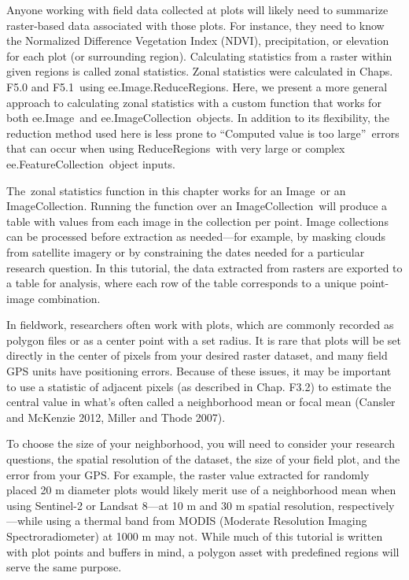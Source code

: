 \documentclass[
  letterpaper,
  DIV=11,
  numbers=noendperiod]{scrreprt}
\begin{document}
Anyone working with field data collected at plots will likely need to
summarize raster-based data associated with those plots. For instance,
they need to know the Normalized Difference Vegetation Index (NDVI),
precipitation, or elevation for each plot (or surrounding region).
Calculating statistics from a raster within given regions is called
zonal statistics. Zonal statistics were calculated in Chaps. F5.0 and
F5.1~using ee.Image.ReduceRegions. Here, we present a more general
approach to calculating zonal statistics with a custom function that
works for both ee.Image~and ee.ImageCollection~objects. In addition to
its flexibility, the reduction method used here is less prone to
``Computed value is too large''~errors that can occur when using
ReduceRegions~with very large or complex ee.FeatureCollection~object
inputs.

The~zonal statistics function in this chapter works for an Image~or an
ImageCollection. Running the function over an ImageCollection~will
produce a table with values from each image in the collection per point.
Image collections can be processed before extraction as needed---for
example, by masking clouds from satellite imagery or by constraining the
dates needed for a particular research question. In this tutorial, the
data extracted from rasters are exported to a table for analysis, where
each row of the table corresponds to a unique point-image combination.

In fieldwork, researchers often work with plots, which are commonly
recorded as polygon files or as a center point with a set radius. It is
rare that plots will be set directly in the center of pixels from your
desired raster dataset, and many field GPS units have positioning
errors. Because of these issues, it may be important to use a statistic
of adjacent pixels (as described in Chap. F3.2) to estimate the central
value in what's often called a neighborhood mean or focal mean (Cansler
and McKenzie 2012, Miller and Thode 2007).

To choose the size of your neighborhood, you will need to consider your
research questions, the spatial resolution of the dataset, the size of
your field plot, and the error from your GPS. For example, the raster
value extracted for randomly placed 20 m diameter plots would likely
merit use of a neighborhood mean when using Sentinel-2 or Landsat 8---at
10 m and 30 m spatial resolution, respectively---while using a thermal
band from MODIS (Moderate Resolution Imaging Spectroradiometer) at 1000
m may not. While much of this tutorial is written with plot points and
buffers in mind, a polygon asset with predefined regions will serve the
same purpose.
\end{document}
